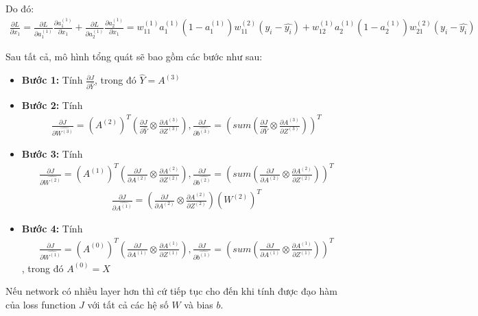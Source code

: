 Do đó:
\begin{align}
\frac{\partial L}{\partial x_1} = \frac{\partial L}{\partial a_1^{(1)}}  \frac{\partial a_1^{(1)}}{\partial x_1} + \frac{\partial L}{\partial a_2^{(1)}}  \frac{\partial a_2^{(1)}}{\partial x_1} =  w_{11}^{(1)}a_1 ^ {(1)}  (1 - a_1^{(1)})  w_{11}^{(2)} (y_i - \hat{y_i}) + w_{12}^{(1)} a_2 ^ {(1)} (1 - a_2^{(1)})  w_{21}^{(2)}  (y_i - \hat{y_i})  
\end{align}

Sau tất cả, mô hình tổng quát sẽ bao gồm các bước như sau:

\begin{itemize}
\item \textbf{Bước 1:} Tính $\frac{\partial J}{\partial \hat{Y}}$, trong đó $\hat{Y} = A^{(3)}$
\item \textbf{Bước 2:} Tính 
\begin{align}
\frac{\partial J}{\partial \hat{W^{(3)}}}= (A^{(2)})^T  (\frac{\partial J}{\partial \hat{Y}} \otimes \frac{\partial A^{(3)}}{\partial Z^{(3)}}),  \frac{\partial J}{\partial \hat{b^{(3)}}}= (sum( \frac{\partial J}{\partial \hat{Y}} \otimes \frac{\partial A^{(3)}}{\partial Z^{(3)}}))^T
\end{align}
\item \textbf{Bước 3:} Tính 
\begin{align}
\frac{\partial J}{\partial \hat{W^{(2)}}}= (A^{(1)})^T  (\frac{\partial J}{\partial A^{(2)}} \otimes \frac{\partial A^{(2)}}{\partial Z^{(2)}}),  \frac{\partial J}{\partial \hat{b^{(2)}}}= (sum (\frac{\partial J}{\partial A^{(2)}} \otimes \frac{\partial A^{(2)}}{\partial Z^{(2)}}))^T
\end{align}
\begin{align}
\frac{\partial J}{\partial \hat{A^{(1)}}}= ( \frac {\partial J}{\partial A^{(2)}} \otimes \frac{\partial A^{(2)}}{\partial Z^{(2)}})  (W^{(2)})^T
\end{align} 
\item \textbf{Bước 4:} Tính
\begin{align}
\frac{\partial J}{\partial \hat{W^{(1)}}}= (A^{(0)})^T   (\frac{\partial J}{\partial A^{(1)}} \otimes \frac{\partial A^{(1)}}{\partial Z^{(1)}}),  \frac{\partial J}{\partial \hat{b^{(1)}}}= (sum (\frac{\partial J}{\partial A^{(1)}} \otimes \frac{\partial A^{(1)}}{\partial Z^{(1)}}))^T
\end{align} , trong đó $A^{(0)} = X$
\end{itemize}

Nếu network có nhiều layer hơn thì cứ tiếp tục cho đến khi tính được đạo hàm của loss function $J$ với tất cả các hệ số $W$ và bias $b$.

